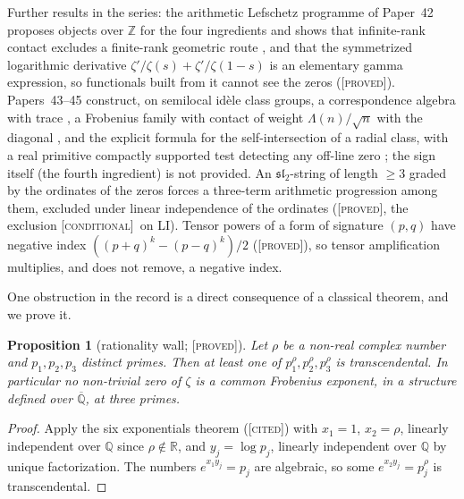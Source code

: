 \documentclass[11pt]{amsart}
\newtheorem{proposition}[theorem]{Proposition}
\theoremstyle{definition}
\theoremstyle{remark}
\numberwithin{equation}{section}
\newcommand{\R}{\mathbb{R}}
\newcommand{\Z}{\mathbb{Z}}
\newcommand{\Q}{\mathbb{Q}}
\newcommand{\stag}[1]{\textsc{[#1]}}
\newcommand{\PROVED}{\stag{proved}}
\newcommand{\CITED}{\stag{cited}}
\newcommand{\COND}{\stag{conditional}}
\begin{document}
Further results in the series: the arithmetic Lefschetz programme of Paper~42 proposes objects over $\Z$ for the
four ingredients and shows that infinite-rank contact excludes a finite-rank geometric route
\cite[Theorem~9.1]{P42}, and that the symmetrized logarithmic derivative $\zeta'/\zeta(s)+\zeta'/\zeta(1-s)$ is an
elementary gamma expression, so functionals built from it cannot see the zeros \cite[Proposition~1.1]{P42}
(\PROVED). Papers~43--45 construct, on semilocal id\`ele class groups, a correspondence algebra with trace
\cite{P43}, a Frobenius family with contact of weight $\Lambda(n)/\sqrt n$ with the diagonal \cite{P44}, and the
explicit formula for the self-intersection of a radial class, with a real primitive compactly supported test
detecting any off-line zero \cite[Theorem~6.2]{P45}; the sign itself (the fourth ingredient) is not provided.
An $\mathfrak{sl}_2$-string of length $\ge3$ graded by the ordinates of the zeros forces a three-term
arithmetic progression among them, excluded under linear independence of the ordinates
\cite[Proposition~5.1]{P17} (\PROVED, the exclusion \COND\ on LI). Tensor powers of a form of signature $(p,q)$
have negative index $((p+q)^k-(p-q)^k)/2$ \cite[Theorem~4.1, Proposition~4.3]{P28} (\PROVED), so tensor
amplification multiplies, and does not remove, a negative index.

One obstruction in the record is a direct consequence of a classical theorem, and we prove it.

\begin{proposition}[rationality wall; \PROVED]\label{w7:prop:rational}
Let $\rho$ be a non-real complex number and $p_1,p_2,p_3$ distinct primes. Then at least one of
$p_1^{\rho},p_2^{\rho},p_3^{\rho}$ is transcendental. In particular no non-trivial zero of $\zeta$ is a common Frobenius
exponent, in a structure defined over $\overline{\Q}$, at three primes.
\end{proposition}

\begin{proof}
Apply the six exponentials theorem \cite{Lang1966} (\CITED) with $x_1=1$, $x_2=\rho$, linearly independent over
$\Q$ since $\rho\notin\R$, and $y_j=\log p_j$, linearly independent over $\Q$ by unique factorization. The
numbers $e^{x_1y_j}=p_j$ are algebraic, so some $e^{x_2y_j}=p_j^\rho$ is transcendental.
\end{proof}
\end{document}
